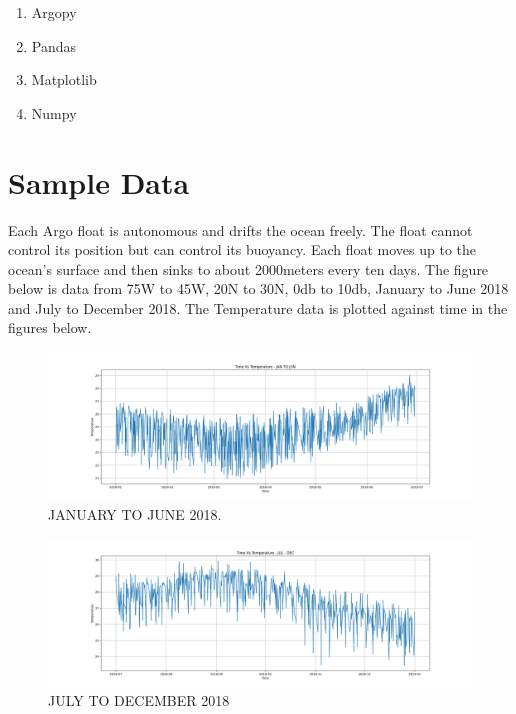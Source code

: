 \documentclass{article}
\begin{document}
\begin{enumerate}
\item Argopy
\item Pandas 
\item Matplotlib
\item Numpy 
\end{enumerate}


\section{Sample Data}

Each Argo float is autonomous and drifts the ocean freely. The float cannot control its position but can control its buoyancy. Each float moves up to the ocean's surface and then sinks to about 2000meters every ten days.
The figure below is data from 75W to 45W, 20N to 30N, 0db to 10db, January to June 2018 and July to December 2018. The Temperature data is plotted against time in the figures below.
\begin{figure}[h]
\begin{center}
\includegraphics[width=1\textwidth]{JAN_JUN.png} %
\caption{JANUARY TO JUNE 2018.}
\end{center}
\end{figure}

\begin{figure}[h]
\begin{center}
\includegraphics[width=1\textwidth]{JUL_DEC.png} %
\caption{JULY TO DECEMBER 2018}
\end{center}
\end{figure}
\end{document}
